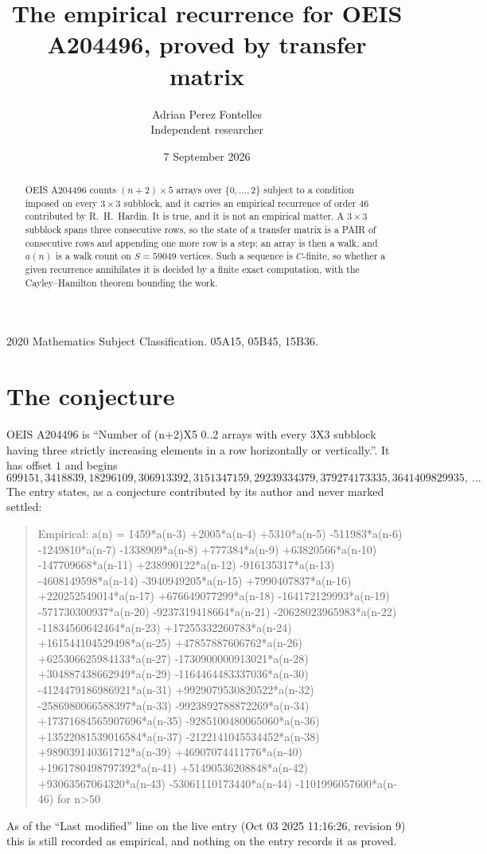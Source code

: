 \documentclass[11pt,a4paper]{article}
\title{The empirical recurrence for OEIS A204496, proved by transfer matrix}
\author{Adrian Perez Fontelles\\ \small Independent researcher}
\date{7 September 2026}
\theoremstyle{plain}
\theoremstyle{definition}
\begin{document}
\maketitle

\begin{abstract}
OEIS A204496 counts $(n+2)\times5$ arrays over $\{0,\dots,2\}$ subject to a condition imposed on
every $3\times3$ subblock, and it carries an empirical recurrence of order $46$
contributed by R.~H.~Hardin. It is true, and it is not an empirical matter. A $3\times3$
subblock spans three consecutive rows, so the state of a transfer matrix is a PAIR of
consecutive rows and appending one more row is a step; an array is then a walk, and
$a(n)$ is a walk count on $S=59049$ vertices. Such a sequence is $C$-finite, so whether a given
recurrence annihilates it is decided by a finite exact computation, with the Cayley--Hamilton
theorem bounding the work.
\end{abstract}

\noindent\small 2020 Mathematics Subject Classification. 05A15, 05B45, 15B36.\normalsize

\section{The conjecture}

OEIS A204496 is ``Number of (n+2)X5 0..2 arrays with every 3X3 subblock having three strictly increasing elements in a row horizontally or vertically.''. It has offset $1$ and begins
\[
699151, 3418839, 18296109, 306913392, 3151347159, 29239334379, 379274173335, 3641409829935,\ \dots
\]
The entry states, as a conjecture contributed by its author and never marked settled:
\begin{quote}
Empirical: a(n) = 1459*a(n-3) +2005*a(n-4) +5310*a(n-5) -511983*a(n-6) -1249810*a(n-7) -1338909*a(n-8) +777384*a(n-9) +63820566*a(n-10) -147709668*a(n-11) +238990122*a(n-12) -916135317*a(n-13) -4608149598*a(n-14) -3940949205*a(n-15) +7990407837*a(n-16) +220252549014*a(n-17) +676649077299*a(n-18) -164172129993*a(n-19) -571730300937*a(n-20) -9237319418664*a(n-21) -20628023965983*a(n-22) -11834560642464*a(n-23) +17255332260783*a(n-24) +161544104529498*a(n-25) +47857887606762*a(n-26) +625306625984133*a(n-27) -1730900000913021*a(n-28) +304887438662949*a(n-29) -1164464483337036*a(n-30) -4124479186986921*a(n-31) +9929079530820522*a(n-32) -2586980066588397*a(n-33) -9923892788872269*a(n-34) +17371684565907696*a(n-35) -9285100480065060*a(n-36) +13522081539016584*a(n-37) -2122141045534452*a(n-38) +989039140361712*a(n-39) +46907074411776*a(n-40) +1961780498797392*a(n-41) +51490536208848*a(n-42) +93063567064320*a(n-43) -53061110173440*a(n-44) -1101996057600*a(n-46) for n>50
\end{quote}
As of the ``Last modified'' line on the live entry (Oct 03 2025 11:16:26, revision 9) this is still
recorded as empirical, and nothing on the entry records it as proved.
\end{document}
